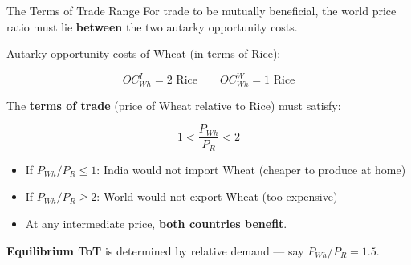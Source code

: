 \documentclass[
  ignorenonframetext,
  aspectratio=169,
]{beamer}
\makeatletter
\providecommand{\tightlist}{%
  \setlength{\itemsep}{0pt}\setlength{\parskip}{0pt}}
\let\quarto@originallabel\label
\DeclareRobustCommand*{\label}[1]{\quarto@originallabel{#1}}
\makeatother
\begin{document}
\begin{frame}{The Terms of Trade Range}
\label{the-terms-of-trade-range}
For trade to be mutually beneficial, the world price ratio must lie
\textbf{between} the two autarky opportunity costs.

Autarky opportunity costs of Wheat (in terms of Rice):

\[OC_{Wh}^{I} = 2 \text{ Rice} \qquad OC_{Wh}^{W} = 1 \text{ Rice}\]

The \textbf{terms of trade} (price of Wheat relative to Rice) must
satisfy:

\[1 < \frac{P_{Wh}}{P_R} < 2\]

\begin{itemize}
\tightlist
\item
  If \(P_{Wh}/P_R \leq 1\): India would not import Wheat (cheaper to
  produce at home)
\item
  If \(P_{Wh}/P_R \geq 2\): World would not export Wheat (too expensive)
\item
  At any intermediate price, \textbf{both countries benefit}.
\end{itemize}

\textbf{Equilibrium ToT} is determined by relative demand --- say
\(P_{Wh}/P_R = 1.5\).
\end{frame}
\end{document}
